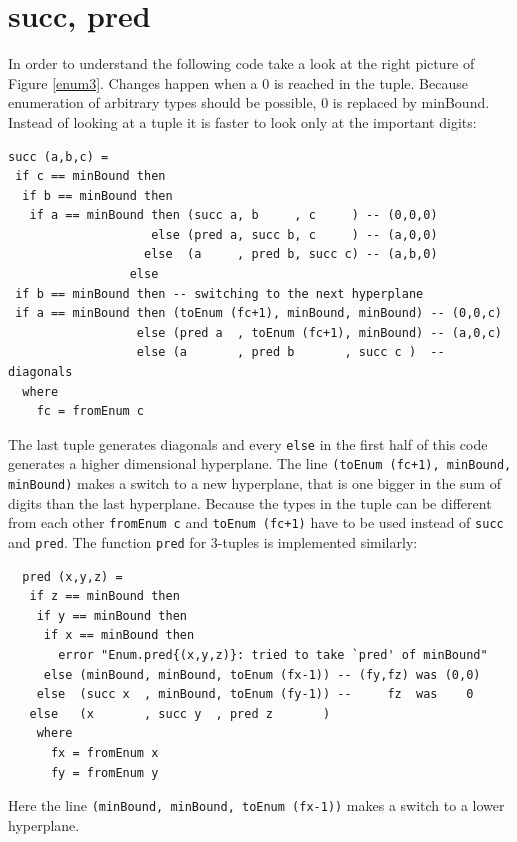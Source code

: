 \documentclass{tmr}
\newcommand{\authornote}[3]{{\color{#2} {\sc #1}: #3}}
\newcommand\bay[1]{\authornote{edward}{blue}{#1}}
\newcommand\tkv[1]{\authornote{Tillmann}{green}{#1}}
\begin{document}
\section{succ, pred}
In order to understand the following code take a look at the right picture  of Figure \ref{enum3}. Changes happen when a 0 is reached in the tuple. Because enumeration of arbitrary types should be possible, 0 is replaced by minBound. Instead of looking at a tuple it is faster to look only at the important digits: %
\small
\begin{Verbatim}
succ (a,b,c) =
 if c == minBound then
  if b == minBound then
   if a == minBound then (succ a, b     , c     ) -- (0,0,0)
                    else (pred a, succ b, c     ) -- (a,0,0)
                   else  (a     , pred b, succ c) -- (a,b,0)
                 else
 if b == minBound then -- switching to the next hyperplane
 if a == minBound then (toEnum (fc+1), minBound, minBound) -- (0,0,c)
                  else (pred a  , toEnum (fc+1), minBound) -- (a,0,c)
                  else (a       , pred b       , succ c )  -- diagonals
  where
    fc = fromEnum c
\end{Verbatim}
The last tuple generates diagonals and every \verb|else| in the first half of this code generates a higher dimensional hyperplane.
The line \verb|(toEnum (fc+1), minBound, minBound)| makes a switch to a new hyperplane, that is one bigger in the sum of digits than the last hyperplane. Because the types in the tuple can be different from each other \verb|fromEnum c| and \verb|toEnum (fc+1)| have to be used instead of \verb|succ| and \verb|pred|. The function \verb|pred| for 3-tuples is implemented similarly:

\begin{Verbatim}
  pred (x,y,z) =
   if z == minBound then
    if y == minBound then
     if x == minBound then
       error "Enum.pred{(x,y,z)}: tried to take `pred' of minBound"
     else (minBound, minBound, toEnum (fx-1)) -- (fy,fz) was (0,0)
    else  (succ x  , minBound, toEnum (fy-1)) --     fz  was    0
   else   (x       , succ y  , pred z       )
    where
      fx = fromEnum x
      fy = fromEnum y
\end{Verbatim}
Here the line \verb|(minBound, minBound, toEnum (fx-1))| makes a switch to a lower hyperplane.
\end{document}
